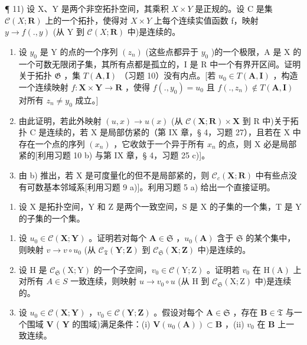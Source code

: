 ¶ 11) 设 X、Y 是两个非空拓扑空间，其乘积 \(X \times Y\) 是正规的。设 C 是集 \(\mathcal{C}(X; \mathbf{R})\) 上的一个拓扑，使得对 \(X \times Y\) 上每个连续实值函数 f，映射 \(y \to f(., y)\) (从 Y 到 \(\mathcal{C}(X; \mathbf{R})\) 中)是连续的。

\begin{enumerate}
\def\labelenumi{\alph{enumi})}
\item
  设 \(y_0\) 是 Y 的点的一个序列 \((z_n)\) (这些点都异于 \(y_0\) )的一个极限，A 是 X 的一个可数无限闭子集，其所有点都是孤立的，I 是 R 中一个有界开区间。证明关于拓扑 \(\mathfrak{G}\) ，集 \(T(\mathbf{A}, \mathbf{I})\) （习题 10）没有内点。{[}若 \(u_0 \in T(\mathbf{A}, \mathbf{I})\) ，构造一个连续映射 \(f: \mathbf{X} \times \mathbf{Y} \to \mathbf{R}\) ，使得 \(f(., y_0) = u_0\) 且 \(f(., z_n) \notin T(\mathbf{A}, \mathbf{I})\) 对所有 \(z_n \neq y_0\) 成立。{]}
\item
  由此证明，若此外映射 \((u, x) \to u(x)\) (从 \(\mathcal{C}(\mathbf{X}; \mathbf{R}) \times \mathbf{X}\) 到 R 中)关于拓扑 C 是连续的，若 X 是局部仿紧的（第 IX 章，§ 4，习题 27），且若在 X 中存在一个点的序列 \((x_{n})\) ，它收敛于一个异于所有 \(x_{n}\) 的点，则 X 必是局部紧的{[}利用习题 10 b) 与第 IX 章，§ 4，习题 25 c){]}。
\item
  由 b) 推出，若 X 是可度量化的但不是局部紧的，则 \(\mathcal{C}_{c}(\mathbf{X};\mathbf{R})\) 中有些点没有可数基本邻域系{[}利用习题 9 a){]}。利用习题 5 a) 给出一个直接证明。
\end{enumerate}

\begin{enumerate}
\def\labelenumi{\arabic{enumi})}
\setcounter{enumi}{11}
\tightlist
\item
  设 X 是拓扑空间，Y 和 Z 是两个一致空间，S 是 X 的子集的一个集，T 是 Y 的子集的一个集。
\end{enumerate}

\begin{enumerate}
\def\labelenumi{\alph{enumi})}
\item
  设 \(u_0 \in \mathcal{C}(\mathbf{X}; \mathbf{Y})\) 。证明若对每个 \(\mathbf{A} \in \mathfrak{S}\) ，\(u_0(\mathbf{A})\) 含于 \(\mathfrak{S}\) 的某个集中，则映射 \(v \to v \circ u_0\) (从 \(\mathcal{C}_{\mathfrak{T}}(\mathbf{Y}; \mathbf{Z})\) 到 \(\mathcal{C}_{\mathfrak{S}}(\mathbf{X}; \mathbf{Z})\) 中)是连续的。
\item
  设 H 是 \(\mathcal{C}_{\mathfrak{S}}(\mathrm{X};\mathrm{Y})\) 的一个子空间，\(v_{0}\in\mathcal{C}(\mathrm{Y};\mathrm{Z})\) 。证明若 \(v_{0}\) 在 \(\mathrm{H}(\mathrm{A})\) 上对所有 \(A\in S\) 一致连续，则映射 \(u\to v_{0}\circ u\) (从 H 到 \(\mathcal{C}_{\mathfrak{S}}(\mathrm{X};\mathrm{Z})\) 中)是连续的。
\item
  设 \(u_0 \in \mathcal{C}(\mathbf{X}; \mathbf{Y})\) ，\(v_0 \in \mathcal{C}(\mathbf{Y}; \mathbf{Z})\) 。假设对每个 \(\mathbf{A} \in \mathfrak{S}\) ，存在 \(\mathbf{B} \in \mathfrak{T}\) 与一个围域 \(\mathbf{V}\) ( \(\mathbf{Y}\) 的围域)满足条件：(i) \(\mathbf{V}(u_0(\mathbf{A})) \subset \mathbf{B}\) ，(ii) \(v_0\) 在 \(\mathbf{B}\) 上一致连续。
\end{enumerate}

